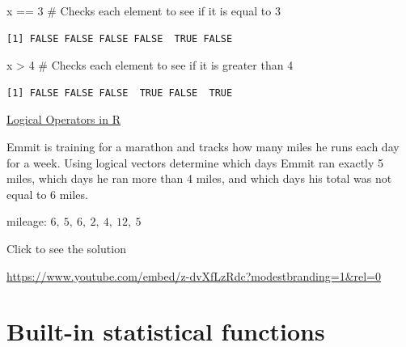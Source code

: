 \documentclass[
  letterpaper,
  DIV=11,
  numbers=noendperiod]{scrreprt}
\newenvironment{Shaded}{\begin{snugshade}}{\end{snugshade}}
\newcommand{\CommentTok}[1]{\textcolor[rgb]{0.37,0.37,0.37}{#1}}
\newcommand{\DecValTok}[1]{\textcolor[rgb]{0.68,0.00,0.00}{#1}}
\newcommand{\NormalTok}[1]{\textcolor[rgb]{0.00,0.23,0.31}{#1}}
\newcommand{\SpecialCharTok}[1]{\textcolor[rgb]{0.37,0.37,0.37}{#1}}
\begin{document}
\begin{Shaded}
\begin{Highlighting}[]
\NormalTok{x }\SpecialCharTok{==} \DecValTok{3} \CommentTok{\# Checks each element to see if it is equal to 3}
\end{Highlighting}
\end{Shaded}

\begin{verbatim}
[1] FALSE FALSE FALSE FALSE  TRUE FALSE
\end{verbatim}

\begin{Shaded}
\begin{Highlighting}[]
\NormalTok{x }\SpecialCharTok{\textgreater{}} \DecValTok{4} \CommentTok{\# Checks each element to see if it is greater than 4}
\end{Highlighting}
\end{Shaded}

\begin{verbatim}
[1] FALSE FALSE FALSE  TRUE FALSE  TRUE
\end{verbatim}

\begin{watch}{}{}
    \href{https://youtu.be/IKVtf3-yO3k}{Logical Operators in R}
\end{watch}

\begin{tcolorbox}[enhanced jigsaw, colbacktitle=quarto-callout-tip-color!10!white, breakable, bottomrule=.15mm, colframe=quarto-callout-tip-color-frame, left=2mm, opacitybacktitle=0.6, title=\textcolor{quarto-callout-tip-color}{\faLightbulb}\hspace{0.5em}{Try it Out}, leftrule=.75mm, opacityback=0, rightrule=.15mm, titlerule=0mm, bottomtitle=1mm, colback=white, toprule=.15mm, arc=.35mm, toptitle=1mm, coltitle=black]

Emmit is training for a marathon and tracks how many miles he runs each
day for a week. Using logical vectors determine which days Emmit ran
exactly 5 miles, which days he ran more than 4 miles, and which days his
total was not equal to 6 miles.

mileage: \(6,\ 5,\ 6,\ 2,\ 4,\ 12,\ 5\)

Click to see the solution

\url{https://www.youtube.com/embed/z-dvXfLzRdc?modestbranding=1&rel=0}

\end{tcolorbox}

\section{Built-in statistical
functions}\label{built-in-statistical-functions}
\end{document}
